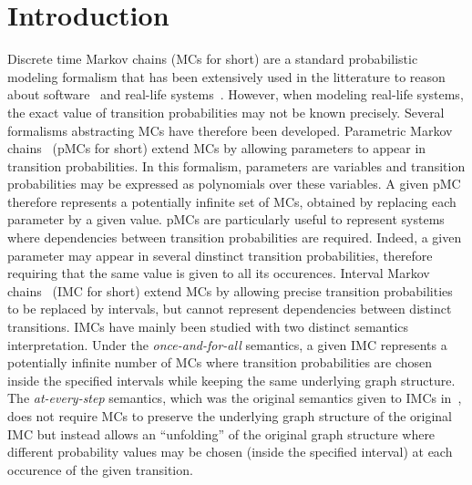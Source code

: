 \documentclass{llncs}
\newcommand{\dtmc}{\textnormal{MC}}
\newcommand{\imc}{\textnormal{IMC}}
\newcommand{\pmc}{\textnormal{pMC}}
\newcommand{\comment}[2]{{\color{gray}{\small{\underline{#1:} #2}}}}
\newcommand{\didier}[1]{\marginpar{\comment{Didier}{#1}}}%
\begin{document}
\section{Introduction}

Discrete time Markov chains ({\dtmc}s for short) are a standard
probabilistic modeling formalism that has been extensively used 
in the litterature 
to reason about software~\cite{whittaker1994markov} and real-life
systems~\cite{Husmeier2010}. However, when modeling real-life systems, the exact
value of transition probabilities may not be known precisely. Several
formalisms abstracting {\dtmc}s have therefore been
developed. Parametric Markov chains~\cite{Alur93} ({\pmc}s for short)
extend {\dtmc}s by allowing parameters to appear in transition
probabilities. In this formalism, parameters are variables and
transition probabilities may be expressed as polynomials over these
variables. A given {\pmc} therefore represents a potentially
infinite set of {\dtmc}s, obtained by replacing each parameter by a
given value. {\pmc}s are particularly useful to represent systems
where dependencies between transition probabilities are
required. Indeed, a given parameter may appear in several dinstinct
transition probabilities, therefore requiring that the same value is
given to all its occurences. Interval Markov chains~\cite{JonssonL91} ({\imc}
for short)
extend {\dtmc}s by allowing precise
transition probabilities to be replaced by intervals, but cannot represent dependencies between distinct transitions. {\imc}s have mainly
been studied with two distinct semantics interpretation. Under the
{\em once-and-for-all} semantics, a given {\imc} represents a
potentially infinite number of {\dtmc}s where transition probabilities
are chosen inside the specified intervals while keeping the same
underlying graph structure. The {\em at-every-step} semantics, which
was the original semantics given to {\imc}s in~\cite{JonssonL91}, does not
require {\dtmc}s to preserve the underlying graph structure of the
original {\imc} but instead allows an ``unfolding'' of the original
graph structure where different probability values may be chosen
(inside the specified interval) at each occurence of the given
transition.
\end{document}
